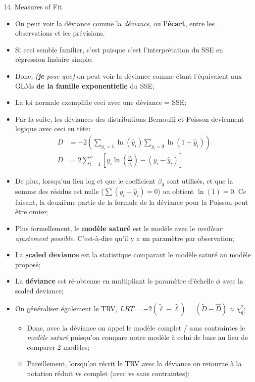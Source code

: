 \documentclass[12pt, titlepage, french]{report}
\begin{document}
\begin{CHPT_SUMM}{14. Measures of Fit}
\begin{enumerate}
	\begin{itemize}
		\item	On peut voir la déviance comme la \textit{déviance}, ou \textbf{l'écart}, entre les observations et les prévisions. 
		\item[]	Si ceci semble familier, c'est puisque c'est l'interprétation du SSE en régression linéaire simple;
		\item[]	Donc, \textit{(\textbf{je} pose que)} on peut voir la déviance comme étant l'équivalent aux GLMs \textbf{de la famille exponentielle} du SSE;
		\item	La loi normale exemplifie ceci avec une déviance = SSE;
		\item	Par la suite, les déviances des distributions Bernoulli et Poisson deviennent logique avec ceci en tête:
		\begin{align*}
			D	&=	-2 \left( \underset{y_{i} = 1}{\sum} \ln(\hat{y}_{i}) \underset{y_{i} = 0}{\sum} \ln(1 - \hat{y}_{i}) \right)	\\
			D	&=	2 \sum_{i = 1}^{n} \left[ y_{i} \ln \left( \frac{y_{i}}{\hat{y}_{i}} \right) - (y_{i} - \hat{y}_{i}) \right]
		\end{align*}
		\item[]	De plus, lorsqu'un lien log et que le coefficient $\beta_{0}$ sont utilisés, et que la somme des résidus est nulle ($\sum (y_{i} - \hat{y}_{i}) = 0$) on obtient $\ln(1) = 0$. Ce faisant, la deuxième partie de la formule de la déviance pour la Poisson peut être omise;
		\item	Plus formellement, le \textbf{modèle saturé} est le modèle avec le \textit{meilleur ajustement possible}. C'est-à-dire qu'il y a un paramètre par observation;
		\item	La \textbf{scaled deviance} est la statistique comparant le modèle saturé au modèle proposé;
		\item	La \textbf{déviance} est ré-obtenue en multipliant le paramètre d'échelle $\phi$ avec la scaled deviance;
	\item On généraliser également le TRV, $LRT = -2(\tilde{\ell} - \hat{\ell}) = (\tilde{D} - \hat{D}) \approx	\chi_{q}^{2}$;
		\begin{itemize}
			\item	Donc, avec la déviance on appel le modèle complet / sans contraintes le \textit{modèle saturé} puisqu'on compare notre modèle à celui de base au lieu de comparer 2 modèles;
			\item	Pareillement, lorsqu'on récrit le TRV avec la déviance on retourne à la notation réduit vs complet (avec vs sans contraintes);

\end{itemize}
\end{itemize}
\end{enumerate}
\end{CHPT_SUMM}
\end{document}
